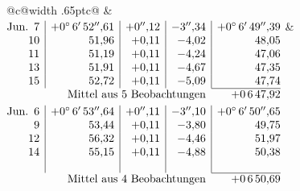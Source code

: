 \noindent\begin{tabular}{@{}c@{\hspace{.4em}\vrule width .65pt\hspace{.4em}}c@{}}
 &
 \\[.18ex]
\(\begin{array}[t]{@{}r|r|r|r|r@{}}
\text{Jun.}\enspace 7 & +0^\circ\,6'\,52''{,}61 & +0''{,}12 & -3''{,}34 & +0^\circ\,6'\,49''{,}39\\
10 & 51{,}96 & +0{,}11 & -4{,}02 & 48{,}05\\
11 & 51{,}19 & +0{,}11 & -4{,}24 & 47{,}06\\
13 & 51{,}91 & +0{,}11 & -4{,}67 & 47{,}35\\
15 & 52{,}72 & +0{,}11 & -5{,}09 & 47{,}74\\
\cline{5-5}
\multicolumn{4}{r}{\text{Mittel aus 5 Beobachtungen}} & +0\,6\,47{,}92
\end{array}\)
&
\(\begin{array}[t]{@{}r|r|r|r|r@{}}
\text{Jun.}\enspace 6 & +0^\circ\,6'\,53''{,}64 & +0''{,}11 & -3''{,}10 & +0^\circ\,6'\,50''{,}65\\
9 & 53{,}44 & +0{,}11 & -3{,}80 & 49{,}75\\
12 & 56{,}32 & +0{,}11 & -4{,}46 & 51{,}97\\
14 & 55{,}15 & +0{,}11 & -4{,}88 & 50{,}38\\
 & & & & \\
\cline{5-5}
\multicolumn{4}{r}{\text{Mittel aus 4 Beobachtungen}} & +0\,6\,50{,}69
\end{array}\)
\end{tabular}\par\medskip
{}
